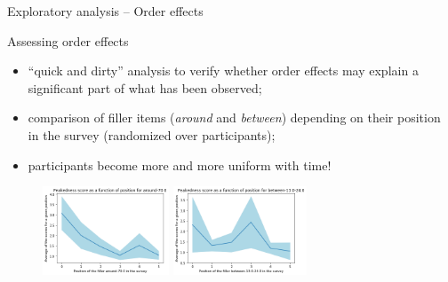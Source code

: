 \documentclass[xcolor=table, hyperref={pdfpagelabels=false}]{beamer}
\begin{document}
\begin{frame}{Exploratory analysis -- Order effects}
\begin{block}{Assessing order effects}
	\begin{itemize}
	\item ``quick and dirty'' analysis to verify whether order effects may explain a significant part of what has been observed;
	\item comparison of filler items (\textit{around} and \textit{between}) depending on their position in the survey (randomized over participants);
	\item participants become more and more uniform with time!
\end{itemize}
\end{block}
\begin{figure}
	\includegraphics[height=100px]{./images/evol_peakedness_around_70.png}
	\includegraphics[height=100px]{./images/evol_peakedness_between_13_24.png}
\end{figure}
\end{frame}
\end{document}
